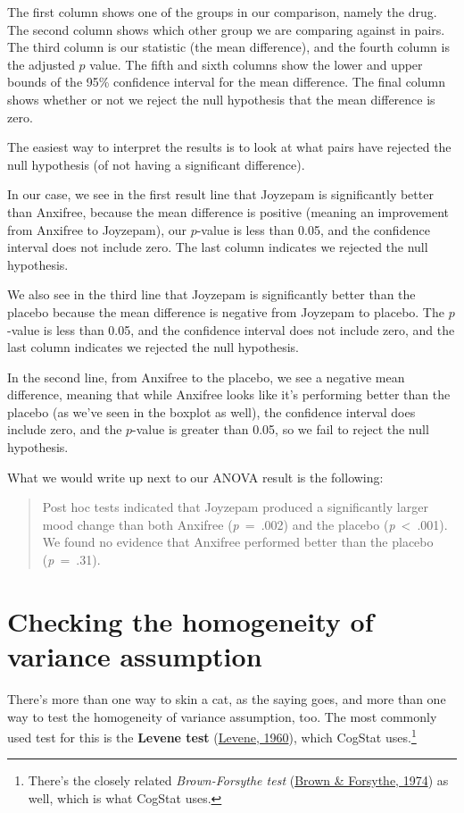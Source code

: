 \documentclass[
]{book}
\theoremstyle{definition}
\theoremstyle{definition}
\theoremstyle{definition}
\theoremstyle{definition}
\theoremstyle{remark}
\begin{document}
The first column shows one of the groups in our comparison, namely the drug. The second column shows which other group we are comparing against in pairs. The third column is our statistic (the mean difference), and the fourth column is the adjusted \(p\) value. The fifth and sixth columns show the lower and upper bounds of the 95\% confidence interval for the mean difference. The final column shows whether or not we reject the null hypothesis that the mean difference is zero.

The easiest way to interpret the results is to look at what pairs have rejected the null hypothesis (of not having a significant difference).

In our case, we see in the first result line that Joyzepam is significantly better than Anxifree, because the mean difference is positive (meaning an improvement from Anxifree to Joyzepam), our \(p\)-value is less than 0.05, and the confidence interval does not include zero. The last column indicates we rejected the null hypothesis.

We also see in the third line that Joyzepam is significantly better than the placebo because the mean difference is negative from Joyzepam to placebo. The \(p\)-value is less than 0.05, and the confidence interval does not include zero, and the last column indicates we rejected the null hypothesis.

In the second line, from Anxifree to the placebo, we see a negative mean difference, meaning that while Anxifree looks like it's performing better than the placebo (as we've seen in the boxplot as well), the confidence interval does include zero, and the \(p\)-value is greater than 0.05, so we fail to reject the null hypothesis.

What we would write up next to our ANOVA result is the following:

\begin{quote}
Post hoc tests indicated that Joyzepam produced a significantly larger mood change than both Anxifree (\emph{p}~=~.002) and the placebo (\emph{p}~\textless~.001). We found no evidence that Anxifree performed better than the placebo (\emph{p}~=~.31).
\end{quote}

\hypertarget{levene}{%
\section{Checking the homogeneity of variance assumption}\label{levene}}

There's more than one way to skin a cat, as the saying goes, and more than one way to test the homogeneity of variance assumption, too. The most commonly used test for this is the \textbf{Levene test} (\protect\hyperlink{ref-Levene1960}{Levene, 1960}), which CogStat uses.\footnote{There's the closely related \emph{Brown-Forsythe test} (\protect\hyperlink{ref-BrownForsythe1974}{Brown \& Forsythe, 1974}) as well, which is what CogStat uses.}
\end{document}
